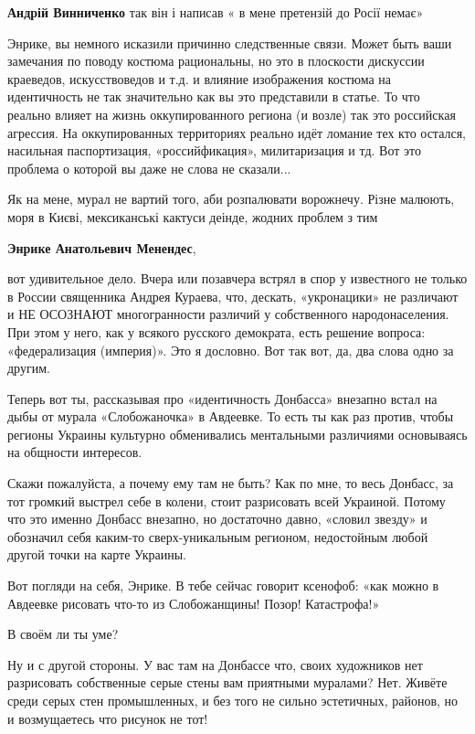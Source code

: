 \begin{itemize}
\begin{itemize}
\textbf{Андрій Винниченко} так він і написав « в мене претензій до Росії немає»
\end{itemize} %


Энрике, вы немного исказили причинно следственные связи. Может быть ваши
замечания по поводу костюма рациональны, но это в плоскости дискуссии
краеведов, искусствоведов и т.д. и влияние изображения костюма на идентичность
не так значительно как вы это представили в статье. То что реально влияет на
жизнь оккупированного региона (и возле) так это российская агрессия. На
оккупированных территориях реально идёт ломание тех кто остался, насильная
паспортизация, «российфикация», милитаризация и тд. Вот это проблема о которой
вы даже не слова не сказали...


Як на мене, мурал не вартий того, аби розпалювати ворожнечу. Різне малюють,
моря в Києві, мексиканські кактуси деінде, жодних проблем з тим

\textbf{Энрике Анатольевич Менендес}, 

вот удивительное дело. Вчера или позавчера встрял в спор у известного не только
в России священника Андрея Кураева, что, дескать, «укронацики» не различают и
НЕ ОСОЗНАЮТ многогранности различий у собственного народонаселения. При этом у
него, как у всякого русского демократа, есть решение вопроса: «федерализация
(империя)». Это я дословно. Вот так вот, да, два слова одно за другим.

Теперь вот ты, рассказывая про «идентичность Донбасса» внезапно встал на дыбы
от мурала «Слобожаночка» в Авдеевке. То есть ты как раз против, чтобы регионы
Украины культурно обменивались ментальными различиями основываясь на общности
интересов.

Скажи пожалуйста, а почему ему там не быть? Как по мне, то весь Донбасс, за тот
громкий выстрел себе в колени, стоит разрисовать всей Украиной. Потому что это
именно Донбасс внезапно, но достаточно давно, «словил звезду» и обозначил себя
каким-то сверх-уникальным регионом, недостойным любой другой точки на карте
Украины.

Вот погляди на себя, Энрике. В тебе сейчас говорит ксенофоб: «как можно в
Авдеевке рисовать что-то из Слобожанщины! Позор! Катастрофа!»

В своём ли ты уме?

Ну и с другой стороны. У вас там на Донбассе что, своих художников нет
разрисовать собственные серые стены вам приятными муралами? Нет. Живёте среди
серых стен промышленных, и без того не сильно эстетичных, районов, но и
возмущаетесь что рисунок не тот!


\end{itemize}
